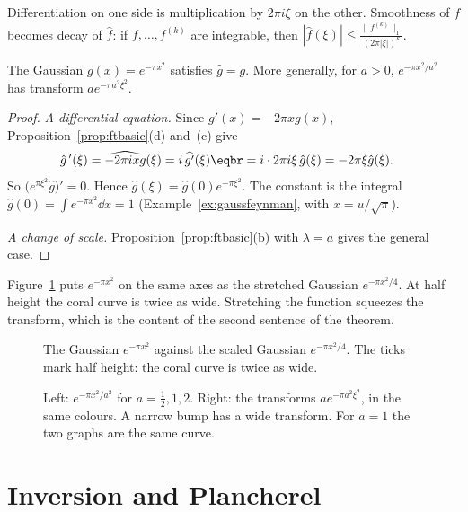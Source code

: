 Differentiation on one side is multiplication by $2\pi i\xi$ on the other. Smoothness of $f$ becomes decay of $\hat f$: if $f,\dots,f^{(k)}$ are integrable, then $|\hat f(\xi)|\le\frac{\|f^{(k)}\|_1}{(2\pi|\xi|)^k}$.

\begin{theorem}\label{thm:gaussianft}
The Gaussian $g(x)=e^{-\pi x^2}$ satisfies $\hat g=g$. More generally, for $a>0$, $e^{-\pi x^2/a^2}$ has transform $ae^{-\pi a^2\xi^2}$.
\end{theorem}
\begin{proof}
\emph{A differential equation.} Since $g'(x)=-2\pi xg(x)$, Proposition~\ref{prop:ftbasic}(d) and~(c) give
\[
\begin{aligned}\hat g\,'(\xi)&=\widehat{-2\pi ixg}(\xi)=i\,\widehat{g'}(\xi)\eqbr=i\cdot2\pi i\xi\,\hat g(\xi)=-2\pi\xi\hat g(\xi).\end{aligned}
\]
So $\bigl(e^{\pi\xi^2}\hat g\bigr)'=0$. Hence $\hat g(\xi)=\hat g(0)e^{-\pi\xi^2}$. The constant is the integral $\hat g(0)=\int e^{-\pi x^2}\dd x=1$ (Example~\ref{ex:gaussfeynman}, with $x=u/\sqrt\pi$).

\emph{A change of scale.} Proposition~\ref{prop:ftbasic}(b) with $\lambda=a$ gives the general case.
\end{proof}

Figure~\ref{fig:rw08-gaussian} puts $e^{-\pi x^2}$ on the same axes as the stretched Gaussian $e^{-\pi x^2/4}$. At half height the coral curve is twice as wide. Stretching the function squeezes the transform, which is the content of the second sentence of the theorem.

\begin{figure}[ht]
\centering
{}
\caption{The Gaussian $e^{-\pi x^2}$ against the scaled Gaussian $e^{-\pi x^2/4}$. The ticks mark half height: the coral curve is twice as wide.}
\label{fig:rw08-gaussian}
\end{figure}

\begin{figure}[ht]
\centering
{}
\caption{Left: $e^{-\pi x^2/a^2}$ for $a=\frac12,1,2$. Right: the transforms $ae^{-\pi a^2\xi^2}$, in the same colours. A narrow bump has a wide transform. For $a=1$ the two graphs are the same curve.}
\label{fig:gaussians}
\end{figure}

\section{Inversion and Plancherel}

